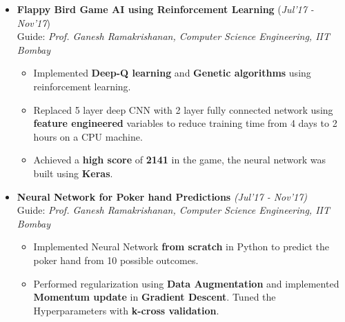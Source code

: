 \documentclass[10pt]{article}
\begin{document}
\colorbox{bl}{}
\vspace{-0.5cm}
\begin{itemize}[leftmargin=0.4cm]

\item \textbf{Flappy Bird Game AI using Reinforcement Learning}
\hfill{(\textit{Jul'17 - Nov'17})}\\
Guide: \textit{Prof. Ganesh Ramakrishanan, Computer Science Engineering, IIT Bombay}\\\vspace{-0.68cm}
	\begin{itemize}
	\item Implemented \textbf{Deep-Q learning} and \textbf{Genetic algorithms} using reinforcement learning.\vspace{-0.1cm}
	\item Replaced 5 layer deep CNN with 2 layer fully connected network using \textbf{feature engineered} variables to reduce training time from 4 days to 2 hours on a CPU machine.\vspace{-0.1cm}
	\item Achieved a \textbf{high score} of \textbf{2141} in the game, the neural network was built using \textbf{Keras}.
	\end{itemize}
	
	\vspace{-0.15cm}	
	
\item \textbf{Neural Network for Poker hand Predictions}
\hfill{\textit{(Jul'17 - Nov'17)}}\\ 
Guide: \textit{Prof. Ganesh Ramakrishanan, Computer Science Engineering, IIT Bombay}\\\vspace{-0.68cm}
    \begin{itemize}
    \item Implemented Neural Network \textbf{from scratch} in Python to predict the poker hand from 10 possible outcomes.\vspace{-0.1cm}
    \item Performed regularization using \textbf{Data Augmentation} and implemented \textbf{Momentum update} in \textbf{Gradient Descent}. Tuned the Hyperparameters with \textbf{k-cross validation}.
    \end{itemize}
    \vspace{-0.15cm}


\end{itemize}
\end{document}
